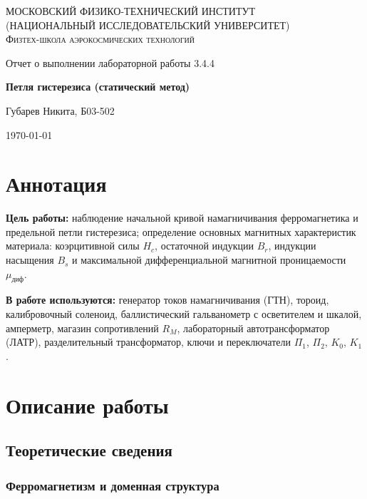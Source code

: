 \documentclass[a4paper]{article}
\begin{document}
\begin{titlepage}
	\centering
	{\scshape\Large МОСКОВСКИЙ ФИЗИКО-ТЕХНИЧЕСКИЙ ИНСТИТУТ \\
		(НАЦИОНАЛЬНЫЙ ИССЛЕДОВАТЕЛЬСКИЙ УНИВЕРСИТЕТ)\\
		Физтех-школа аэрокосмических технологий}
	
	\vspace{4cm}
	{\LARGE Отчет о выполнении лабораторной работы 3.4.4}
	\vspace{1cm}
	
	{\huge\bf Петля гистерезиса (статический метод)}
	
	\vspace{1cm}
	\vfill
	
	\begin{flushright}
		{\LARGE Губарев Никита, Б03-502}
	\end{flushright}
	\vfill 
	\today
\end{titlepage}

\tableofcontents

\section{Аннотация}

\textbf{Цель работы:} наблюдение начальной кривой намагничивания ферромагнетика и предельной петли гистерезиса; определение основных магнитных характеристик материала: коэрцитивной силы $H_c$, остаточной индукции $B_r$, индукции насыщения $B_s$ и максимальной дифференциальной магнитной проницаемости $\mu_{\text{диф}}$.

\textbf{В работе используются:} генератор токов намагничивания (ГТН), тороид, калибровочный соленоид, баллистический гальванометр с осветителем и шкалой, амперметр, магазин сопротивлений $R_M$, лабораторный автотрансформатор (ЛАТР), разделительный трансформатор, ключи и переключатели $\Pi_1$, $\Pi_2$, $K_0$, $K_1$.

\section{Описание работы}

\subsection{Теоретические сведения}

\subsubsection{Ферромагнетизм и доменная структура}
\end{document}
